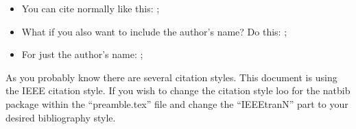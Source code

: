 \begin{itemize}
	\item You can cite normally like this: \cite{reynaud22_iberspeech};
	\item What if you also want to include the author's name? Do this: \citet{reynaud22_iberspeech};
	\item For just the author's name: \citeauthor{reynaud22_iberspeech};
\end{itemize} 

\begin{tcolorbox}[title=A note on citations]
	As you probably know there are several citation styles. This document is using the IEEE citation style. If you wish to change the citation style loo for the natbib package within the ``preamble.tex'' file and change the ``IEEEtranN'' part to your desired bibliography style.
\end{tcolorbox}


